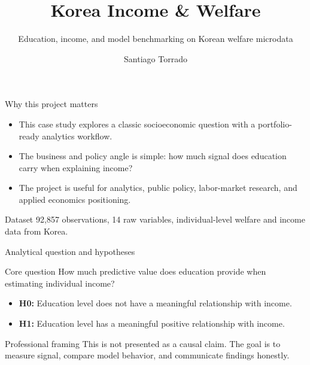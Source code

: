 \documentclass[aspectratio=169]{beamer}
\title{Korea Income \& Welfare}
\subtitle{Education, income, and model benchmarking on Korean welfare microdata}
\author{Santiago Torrado}
\date{}
\begin{document}
\begin{frame}
  \titlepage
\end{frame}

\begin{frame}{Why this project matters}
  \begin{itemize}
    \item This case study explores a classic socioeconomic question with a portfolio-ready analytics workflow.
    \item The business and policy angle is simple: how much signal does education carry when explaining income?
    \item The project is useful for analytics, public policy, labor-market research, and applied economics positioning.
  \end{itemize}

  \begin{block}{Dataset}
    92,857 observations, 14 raw variables, individual-level welfare and income data from Korea.
  \end{block}
\end{frame}

\begin{frame}{Analytical question and hypotheses}
  \begin{block}{Core question}
    How much predictive value does education provide when estimating individual income?
  \end{block}

  \begin{itemize}
    \item \textbf{H0:} Education level does not have a meaningful relationship with income.
    \item \textbf{H1:} Education level has a meaningful positive relationship with income.
  \end{itemize}

  \begin{block}{Professional framing}
    This is not presented as a causal claim. The goal is to measure signal, compare model behavior, and communicate findings honestly.
  \end{block}
\end{frame}
\end{document}
